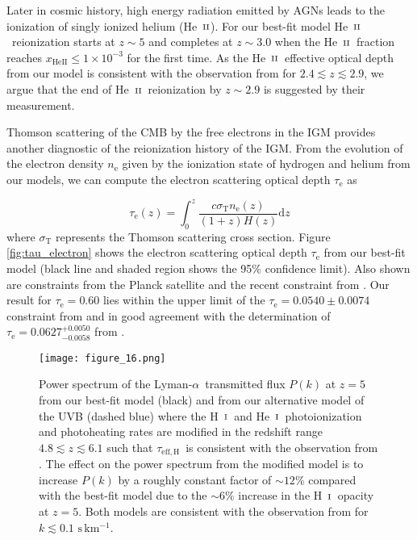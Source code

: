 \documentclass[twocolumn]{aastex62}
\newcommand\Lya{Lyman-$\alpha$}
\def\HI{\hbox{\rm H~$\scriptstyle\rm I$}}
\def\HeI{\hbox{He~$\scriptstyle\rm I$}}
\def\HeII{\hbox{He~$\scriptstyle\rm II$}}
\newcommand\taueffH{$\tau_{\mathrm{eff,H}}$~}
\begin{document}
Later in  cosmic history, high energy radiation emitted by AGNs leads to the ionization of singly ionized helium 
(\HeII). For our best-fit model \HeII\ reionization starts at $z\sim5$ and completes at $z\sim 3.0$ when the \HeII\ fraction reaches
$x_\mathrm{HeII} \leq 1 \times 10^{-3}$ for the first time. As the \HeII\ effective optical depth from our model is consistent with the observation
from \cite{Worseck+2019} for $2.4 \lesssim z \lesssim 2.9$, we argue that the end of \HeII\ reionization by $z\sim 2.9$ is 
suggested by their measurement.   

Thomson scattering of the CMB by the free electrons in the IGM provides
another diagnostic of the reionization history of the IGM.
From the evolution of the electron density $n_\mathrm{e}$ given by the ionization state of hydrogen and helium from our models,
we can compute the electron scattering optical depth 
$\tau_\mathrm{e}$ as
       

\begin{equation}
\tau_{\mathrm{e}}(z)= \int_{0}^{z} \frac{c \sigma_{\mathrm{T}} n_\mathrm{e}(z)}{(1+z) H(z)} \mathrm{d} z
\label{eq:tau_electron}
\end{equation}         
\noindent
where $\sigma_\mathrm{T}$ represents the Thomson scattering cross section.
Figure \ref{fig:tau_electron} shows the
electron scattering optical depth $\tau_\mathrm{e}$ from our best-fit model
(black line and shaded region shows the 95\% confidence limit). Also shown are constraints
from the Planck satellite \citep{Planck_collaboration_2020} and the 
recent constraint from \cite{deBelsunce+2021}.
Our result for $\tau_\mathrm{e}=0.60$ lies
within the upper limit of the $\tau_\mathrm{e}=0.0540 \pm 0.0074$ constraint from
\cite{Planck_collaboration_2020} and in good agreement with the
determination of $\tau_\mathrm{e}=0.0627^{+0.0050}_{-0.0058}$ from \cite{deBelsunce+2021}.


\begin{figure}
\texttt{[image: figure\_16.png]}
\caption{Power spectrum of the \Lya\ transmitted flux $P(k)$ at $z=5$ from our best-fit model (black) and from our alternative model of the UVB (dashed blue) where the \HI\ and \HeI\
photoionization and photoheating rates are modified in the redshift range $4.8 \lesssim z \lesssim 6.1$ such that \taueffH is consistent with the observation from \cite{Bosman_2018}. 
The effect on the power spectrum from the modified model is to increase $P(k)$ by a roughly constant factor of $\sim 12\%$ compared with the best-fit model due to the $\sim 6\%$ 
increase in the \HI\ opacity at $z=5$. Both models are consistent with the observation from \cite{boera2019a} for $k \lesssim 0.1 \,\, \mathrm{s \, km^{-1}}$.}
\label{fig:power_spectrum_z5}
\end{figure}
\end{document}
